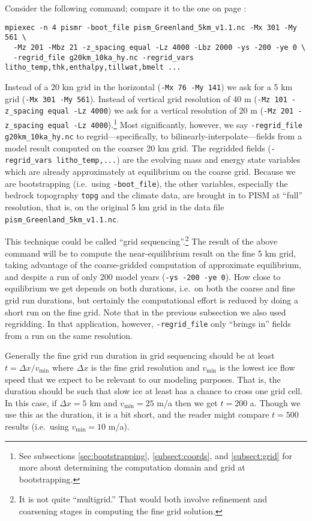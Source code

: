 Consider the following command; compare it to the one on page \pageref{firstcommand}:
\begin{verbatim}
mpiexec -n 4 pismr -boot_file pism_Greenland_5km_v1.1.nc -Mx 301 -My 561 \
  -Mz 201 -Mbz 21 -z_spacing equal -Lz 4000 -Lbz 2000 -ys -200 -ye 0 \
  -regrid_file g20km_10ka_hy.nc -regrid_vars litho_temp,thk,enthalpy,tillwat,bmelt ...
\end{verbatim}
Instead of a 20 km grid in the horizontal (\verb|-Mx 76 -My 141|) we ask for a 5 km grid (\verb|-Mx 301 -My 561|).  Instead of vertical grid resolution of 40 m (\verb|-Mz 101 -z_spacing equal -Lz 4000|) we ask for a vertical resolution of 20 m (\verb|-Mz 201 -z_spacing equal -Lz 4000|).\footnote{See subsections \ref{sec:bootstrapping}, \ref{subsect:coords}, and \ref{subsect:grid} for more about determining the computation domain and grid at bootstrapping.}  Most significantly, however, we say \verb|-regrid_file g20km_10ka_hy.nc| to regrid---specifically, to bilinearly-interpolate---fields from a model result computed on the coarser 20 km grid.  The regridded fields (\verb|-regrid_vars litho_temp,...|) are the evolving mass and energy state variables which are already approximately at equilibrium on the coarse grid.  Because we are bootstrapping (i.e.~using \verb|-boot_file|), the other variables, especially the bedrock topography \verb|topg| and the climate data, are brought in to PISM at ``full'' resolution, that is, on the original 5 km grid in the data file \texttt{pism_Greenland_5km_v1.1.nc}.

This technique could be called ``grid sequencing''.\footnote{It is not quite ``multigrid.''  That would both involve refinement and coarsening stages in computing the fine grid solution.}  The result of the above command will be to compute the near-equilibrium result on the fine 5 km grid, taking advantage of the coarse-gridded computation of approximate equilibrium, and despite a run of only 200 model years (\verb|-ys -200 -ye 0|).  How close to equilibrium we get depends on both durations, i.e.~on both the coarse and fine grid run durations, but certainly the computational effort is reduced by doing a short run on the fine grid.  Note that in the previous subsection we also used regridding.  In that application, however, \verb|-regrid_file| only ``brings in'' fields from a run on the same resolution.

Generally the fine grid run duration in grid sequencing should be at least $t = \Delta x / v_{\text{min}}$ where $\Delta x$ is the fine grid resolution and $v_{\text{min}}$ is the lowest ice flow speed that we expect to be relevant to our modeling purposes.  That is, the duration should be such that slow ice at least has a chance to cross one grid cell.  In this case, if $\Delta x = 5$ km and $v_{\text{min}} = 25$ m/a then we get $t=200$ a.  Though we use this as the duration, it is a bit short, and the reader might compare $t=500$ results (i.e.~using $v_{\text{min}} = 10$ m/a).

